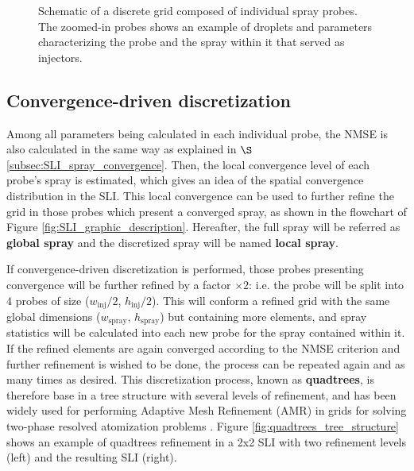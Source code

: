 \clearpage

\begin{figure}[h!]	
	\centering
	\caption{Schematic of a discrete grid composed of individual spray probes. The zoomed-in probes shows an example of droplets and parameters characterizing the probe and the spray within it that served as injectors.}
	\label{fig:SLI_discretization}
\end{figure}


\subsection{Convergence-driven discretization}
\label{subsec:SLI_quadtrees_discretization}

Among all parameters being calculated in each individual probe, the NMSE is also calculated in the same way as explained in $\S$\ref{subsec:SLI_spray_convergence}. Then, the local convergence level of each probe's spray is estimated, which gives an idea of the spatial convergence distribution in the SLI. This local convergence can be used to further refine the grid in those probes which present a converged spray, as shown in the flowchart of Figure \ref{fig:SLI_graphic_description}. Hereafter, the full spray will be referred as \textbf{global spray} and the discretized spray will be named \textbf{local spray}.

If convergence-driven discretization is performed, those probes presenting convergence will be further refined by a factor $\times 2$: i.e. the probe will be split into 4 probes of size ($w_\mathrm{inj}/2$, $h_\mathrm{inj}/2$). This will conform a refined grid with the same global dimensions ($w_\mathrm{spray}$, $h_\mathrm{spray}$) but containing more elements, and spray statistics will be calculated into each new probe for the spray contained within it. If the refined elements are again converged according to the NMSE criterion and further refinement is wished to be done, the process can be repeated again and as many times as desired. This discretization process, known as \textbf{quadtrees}, is therefore base in a tree structure with several levels of refinement, and has been widely used for performing Adaptive Mesh Refinement (AMR) in grids for solving two-phase resolved atomization problems . Figure \ref{fig:quadtrees_tree_structure} shows an example of quadtrees refinement in a 2x2 SLI with two refinement levels (left) and the resulting SLI (right).



